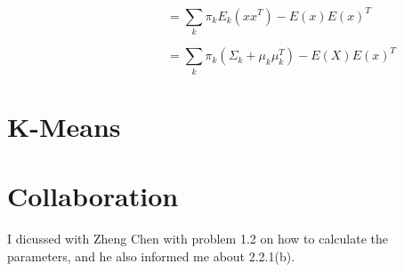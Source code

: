 \documentclass{article} %
\begin{document}
\begin{equation}
\qquad \qquad \qquad
= \sum_k \pi_k E_k (x x^T) - E (x) E(x)^T
\end{equation}

\begin{equation}
\qquad \qquad \qquad \qquad
= \sum_k \pi_k (\Sigma_k + \mu_k \mu_k^T) - E (X) E (x)^T
\end{equation}







\section{K-Means}

\section{Collaboration}
I dicussed with Zheng Chen with problem 1.2 on how to calculate the parameters,
and he also informed me about 2.2.1(b).
\end{document}
